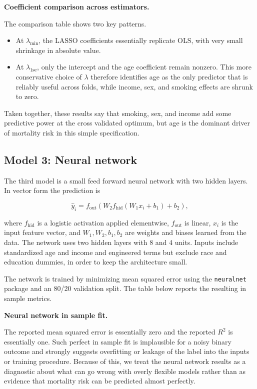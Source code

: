 \documentclass{article}
\begin{document}
\medskip
\noindent\textbf{Coefficient comparison across estimators.}
\par


The comparison table shows two key patterns.

\begin{itemize}
  \item At \(\lambda_{\min}\), the LASSO coefficients essentially replicate OLS, with very small shrinkage in absolute value.
  \item At \(\lambda_{1\text{se}}\), only the intercept and the age coefficient remain nonzero. This more conservative choice of \(\lambda\) therefore identifies age as the only predictor that is reliably useful across folds, while income, sex, and smoking effects are shrunk to zero.
\end{itemize}

Taken together, these results say that smoking, sex, and income add some predictive power at the cross validated optimum, but age is the dominant driver of mortality risk in this simple specification.

\subsection*{Model 3: Neural network}

The third model is a small feed forward neural network with two hidden layers. In vector form the prediction is

\[
\hat y_i
=
f_{\text{out}}\!\left(
  W_2
  f_{\text{hid}}\!\left(
    W_1 x_i + b_1
  \right)
  + b_2
\right),
\]

where \(f_{\text{hid}}\) is a logistic activation applied elementwise, \(f_{\text{out}}\) is linear, \(x_i\) is the input feature vector, and \(W_1, W_2, b_1, b_2\) are weights and biases learned from the data. The network uses two hidden layers with 8 and 4 units. Inputs include standardized age and income and engineered terms but exclude race and education dummies, in order to keep the architecture small.

The network is trained by minimizing mean squared error using the \texttt{neuralnet} package and an 80/20 validation split. The table below reports the resulting in sample metrics.

\medskip
\noindent\textbf{Neural network in sample fit.}
\par


The reported mean squared error is essentially zero and the reported \(R^2\) is essentially one. Such perfect in sample fit is implausible for a noisy binary outcome and strongly suggests overfitting or leakage of the label into the inputs or training procedure. Because of this, we treat the neural network results as a diagnostic about what can go wrong with overly flexible models rather than as evidence that mortality risk can be predicted almost perfectly.
\end{document}
